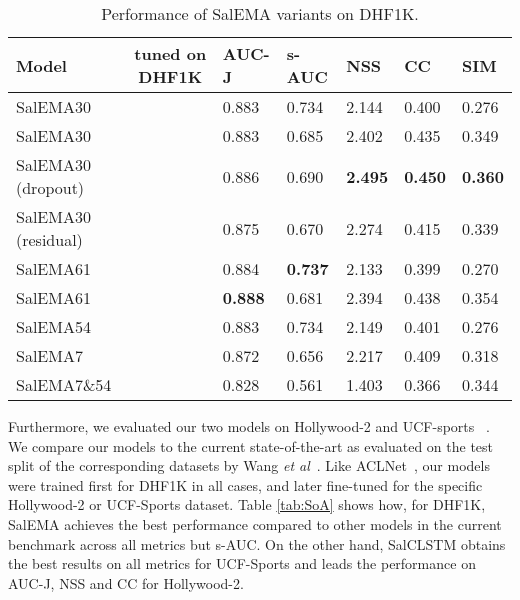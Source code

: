 \documentclass{bmvc2k}
\newcommand{\cmark}{\ding{51}}\newcommand{\xmark}{\ding{55}}
\def\etal{\emph{et al}\bmvaOneDot}
\begin{document}
\begin{table}[t]
\begin{center}
\begin{tabularx}{\textwidth}{Xclllll}
\toprule
\textbf{Model} & tuned on DHF1K &\textbf{AUC-J} &\textbf{s-AUC} & \textbf{NSS} 	&  \textbf{CC}  & \textbf{SIM}\\
\midrule

SalEMA30 &\xmark & 0.883 & 0.734 & 2.144 & 0.400 & 0.276\\
SalEMA30 &\cmark & 0.883 & 0.685 & 2.402 & 0.435 & 0.349\\
\midrule
SalEMA30 (dropout)&\cmark&	0.886&	0.690&	\textbf{2.495}&	\textbf{0.450}&	\textbf{0.360}\\
SalEMA30 (residual)&\cmark&	0.875	&0.670	&2.274	&0.415	&0.339\\
\midrule
SalEMA61 &\xmark &	0.884&	\textbf{0.737}&	2.133&	0.399&	0.270\\
SalEMA61 &\cmark & \textbf{0.888} & 0.681 & 2.394 & 0.438 & 0.354\\
SalEMA54 &\xmark &	0.883&	0.734&	2.149&	0.401&	0.276\\
SalEMA7 &\xmark	&0.872	&0.656	&2.217	&0.409	&0.318\\
SalEMA7\&54 &\cmark &	0.828&	0.561&	1.403&	0.366&	0.344\\

\bottomrule
\end{tabularx}
\end{center}

\caption{Performance of SalEMA variants on DHF1K.}
\label{tab:SalEMA}
\end{table}

Furthermore, we evaluated our two models on Hollywood-2 and UCF-sports ~\cite{Hollywood_UCF}. 
We compare our models to the current state-of-the-art as evaluated on the test split of the corresponding datasets by Wang \etal~\cite{Wang2018a}. 
Like ACLNet~\cite{Wang2018a}, our models were trained first for DHF1K in all cases, and later fine-tuned for the specific Hollywood-2 or UCF-Sports dataset. 
Table \ref{tab:SoA} shows how, for DHF1K, SalEMA achieves the best performance compared to other models in the current benchmark across all metrics but s-AUC. On the other hand, SalCLSTM obtains the best results on all metrics for UCF-Sports and leads the performance on AUC-J, NSS and CC for Hollywood-2. 
\end{document}
